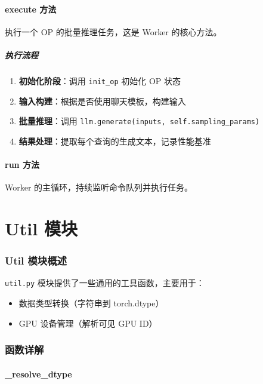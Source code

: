 \documentclass[12pt,a4paper]{article}
\begin{document}
\subsection{execute 方法}

执行一个 OP 的批量推理任务，这是 Worker 的核心方法。

\subsubsection{执行流程}

\begin{enumerate}
    \item \textbf{初始化阶段}：调用 \texttt{init\_op} 初始化 OP 状态
    \item \textbf{输入构建}：根据是否使用聊天模板，构建输入
    \item \textbf{批量推理}：调用 \texttt{llm.generate(inputs, self.sampling\_params)}
    \item \textbf{结果处理}：提取每个查询的生成文本，记录性能基准
\end{enumerate}

\subsection{run 方法}

Worker 的主循环，持续监听命令队列并执行任务。

\part{Util 模块}

\section{Util 模块概述}

\texttt{util.py} 模块提供了一些通用的工具函数，主要用于：
\begin{itemize}
    \item 数据类型转换（字符串到 torch.dtype）
    \item GPU 设备管理（解析可见 GPU ID）
\end{itemize}

\section{函数详解}

\subsection{\_resolve\_dtype}
\end{document}
